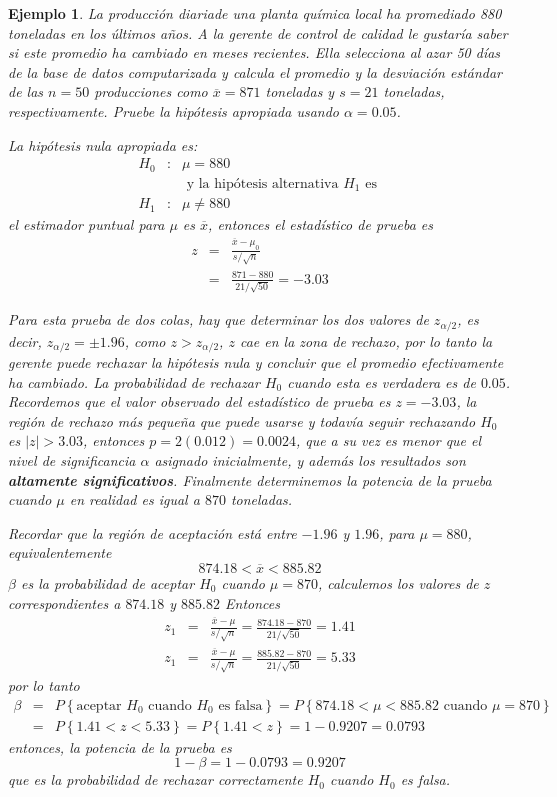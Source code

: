 \documentclass[a4paper]{report} %
\newtheorem{Ejem}{Ejemplo}[chapter]
\begin{document}
\begin{Ejem}
La producci\'on diariade una planta qu\'imica local ha promediado 880 toneladas en los \'ultimos a\~nos. A la gerente de control de calidad le gustar\'ia saber si este promedio ha cambiado en meses recientes. Ella selecciona al azar 50 d\'ias de la base de datos computarizada y calcula el promedio y la desviaci\'on est\'andar de las $n=50$  producciones como $\overline{x}=871$ toneladas y $s=21$ toneladas, respectivamente. Pruebe la hip\'otesis  apropiada usando $\alpha=0.05$.

La hip\'otesis nula apropiada es:
\begin{eqnarray*}
H_{0}&:& \mu=880\\
&&\textrm{ y la hip\'otesis alternativa }H_{1}\textrm{ es }\\
H_{1}&:& \mu\neq880
\end{eqnarray*}
el estimador puntual para $\mu$ es $\overline{x}$, entonces el estad\'istico de prueba es\medskip
\begin{eqnarray*}
z&=&\frac{\overline{x}-\mu_{0}}{s/\sqrt{n}}\\
&=&\frac{871-880}{21/\sqrt{50}}=-3.03
\end{eqnarray*}

Para esta prueba de  dos colas, hay que determinar los dos valores de $z_{\alpha/2}$, es decir,  $z_{\alpha/2}=\pm1.96$, como $z>z_{\alpha/2}$, $z$ cae en la zona de rechazo, por lo tanto  la gerente puede rechazar la hip\'otesis nula y concluir que el promedio efectivamente ha cambiado. La probabilidad de rechazar $H_{0}$ cuando esta es verdadera es de  $0.05$. Recordemos que el valor observado del estad\'istico de prueba es $z=-3.03$, la regi\'on de rechazo m\'as peque\~na que puede usarse y todav\'ia seguir rechazando $H_{0}$ es $|z|>3.03$, entonces $p=2(0.012)=0.0024$, que a su vez es menor que el nivel de significancia $\alpha$ asignado inicialmente, y adem\'as los resultados son  \textbf{altamente significativos}. Finalmente determinemos la potencia de la prueba cuando $\mu$ en realidad es igual a $870$ toneladas.

Recordar que la regi\'on de aceptaci\'on est\'a entre $-1.96$ y $1.96$, para $\mu=880$, equivalentemente $$874.18<\overline{x}<885.82$$
$\beta$ es la probabilidad de aceptar $H_{0}$ cuando $\mu=870$, calculemos los valores de $z$ correspondientes a $874.18$ y $885.82$ \medskip
Entonces
\begin{eqnarray*}
z_{1}&=&\frac{\overline{x}-\mu}{s/\sqrt{n}}=\frac{874.18-870}{21/\sqrt{50}}=1.41\\
z_{1}&=&\frac{\overline{x}-\mu}{s/\sqrt{n}}=\frac{885.82-870}{21/\sqrt{50}}=5.33
\end{eqnarray*}
por lo tanto
\begin{eqnarray*}
\beta&=&P\left\{\textrm{aceptar }H_{0}\textrm{ cuando }H_{0}\textrm{ es falsa}\right\}=P\left\{874.18<\mu<885.82\textrm{ cuando }\mu=870\right\}\\
&=&P\left\{1.41<z<5.33\right\}=P\left\{1.41<z\right\}=1-0.9207=0.0793
\end{eqnarray*}
entonces, la potencia de la prueba es
$$1-\beta=1-0.0793=0.9207$$ que es la probabilidad de rechazar correctamente $H_{0}$ cuando $H_{0}$ es falsa.
\end{Ejem}
\end{document}

